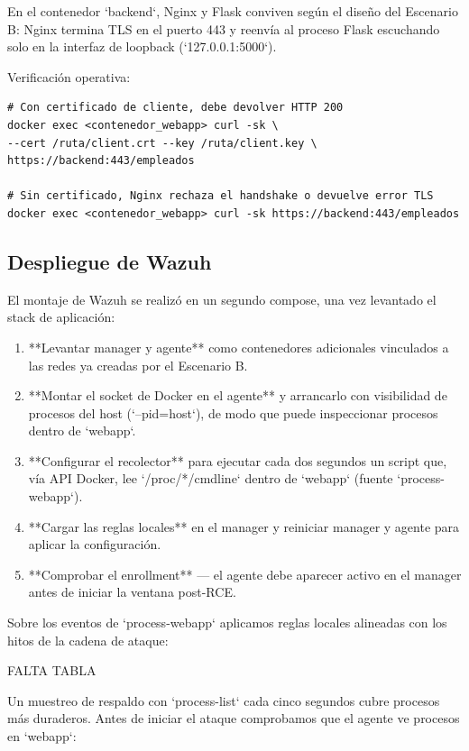 \documentclass[11pt,spanish,listoffigures,listoftables]{tfgetsinf}
\begin{document}
        
        En el contenedor `backend`, Nginx y Flask conviven según el diseño del Escenario B: Nginx termina TLS en el puerto 443 y reenvía al proceso Flask escuchando solo en la interfaz de loopback (`127.0.0.1:5000`).
        
        Verificación operativa:
        \begin{lstlisting}
# Con certificado de cliente, debe devolver HTTP 200
docker exec <contenedor_webapp> curl -sk \
--cert /ruta/client.crt --key /ruta/client.key \
https://backend:443/empleados

# Sin certificado, Nginx rechaza el handshake o devuelve error TLS
docker exec <contenedor_webapp> curl -sk https://backend:443/empleados
        \end{lstlisting}
        
        \subsection{Despliegue de Wazuh}
        El montaje de Wazuh se realizó en un segundo compose, una vez levantado el stack de aplicación:
        \begin{enumerate}
            \item **Levantar manager y agente** como contenedores adicionales vinculados a las redes ya creadas por el Escenario B.
            \item **Montar el socket de Docker en el agente** y arrancarlo con visibilidad de procesos del host (`--pid=host`), de modo que puede inspeccionar procesos dentro de `webapp`.
            \item **Configurar el recolector** para ejecutar cada dos segundos un script que, vía API Docker, lee `/proc/*/cmdline` dentro de `webapp` (fuente `process-webapp`).
            \item **Cargar las reglas locales** en el manager y reiniciar manager y agente para aplicar la configuración.
            \item **Comprobar el enrollment** — el agente debe aparecer activo en el manager antes de iniciar la ventana post-RCE.
        \end{enumerate}
        
        Sobre los eventos de `process-webapp` aplicamos reglas locales alineadas con los hitos de la cadena de ataque:

        FALTA TABLA

        Un muestreo de respaldo con `process-list` cada cinco segundos cubre procesos más duraderos. Antes de iniciar el ataque comprobamos que el agente ve procesos en `webapp`:
\end{document}
